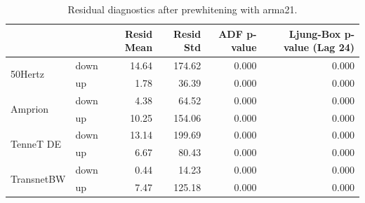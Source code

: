 \begin{table}
\caption{Residual diagnostics after prewhitening with arma21.}
\label{tab:prewhitening_arma21}
\begin{tabular}{llrrrr}
\toprule
 &  & Resid Mean & Resid Std & ADF p-value & Ljung-Box p-value (Lag 24) \\
\midrule
\multirow[t]{2}{*}{50Hertz} & down & 14.64 & 174.62 & 0.000 & 0.000 \\
 & up & 1.78 & 36.39 & 0.000 & 0.000 \\
\cline{1-6}
\multirow[t]{2}{*}{Amprion} & down & 4.38 & 64.52 & 0.000 & 0.000 \\
 & up & 10.25 & 154.06 & 0.000 & 0.000 \\
\cline{1-6}
\multirow[t]{2}{*}{TenneT DE} & down & 13.14 & 199.69 & 0.000 & 0.000 \\
 & up & 6.67 & 80.43 & 0.000 & 0.000 \\
\cline{1-6}
\multirow[t]{2}{*}{TransnetBW} & down & 0.44 & 14.23 & 0.000 & 0.000 \\
 & up & 7.47 & 125.18 & 0.000 & 0.000 \\
\cline{1-6}
\bottomrule
\end{tabular}
\end{table}
